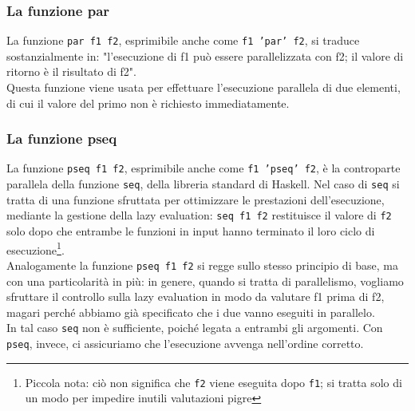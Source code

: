 \subsubsection{La funzione par}
La funzione \texttt{par f1 f2}, esprimibile anche come \texttt{f1 'par' f2}, si traduce sostanzialmente in: "l'esecuzione di f1 può essere parallelizzata con f2; il valore di ritorno è il risultato di f2".\\ Questa funzione viene usata per effettuare l'esecuzione parallela di due elementi, di cui il valore del primo non è richiesto immediatamente.
\subsubsection{La funzione pseq}
La funzione \texttt{pseq f1 f2}, esprimibile anche come \texttt{f1 'pseq' f2}, è la controparte parallela della funzione \texttt{seq}, della libreria standard di Haskell. Nel caso di \texttt{seq} si tratta di una funzione sfruttata per ottimizzare le prestazioni dell'esecuzione, mediante la gestione della lazy evaluation: \texttt{seq f1 f2} restituisce il valore di \texttt{f2} solo dopo che entrambe le funzioni in input hanno terminato il loro ciclo di esecuzione\footnote{Piccola nota: ciò non significa che \texttt{f2} viene eseguita dopo \texttt{f1}; si tratta solo di un modo per impedire inutili valutazioni pigre}.\\
Analogamente la funzione \texttt{pseq f1 f2} si regge sullo stesso principio di base, ma con una particolarità in più: in genere, quando si tratta di parallelismo, vogliamo sfruttare il controllo sulla lazy evaluation in modo da valutare f1 prima di f2, magari perché abbiamo già specificato che i due vanno eseguiti in parallelo.\\
In tal caso \texttt{seq} non è sufficiente, poiché legata a entrambi gli argomenti. Con \texttt{pseq}, invece, ci assicuriamo che l'esecuzione avvenga nell'ordine corretto.
\newpage

